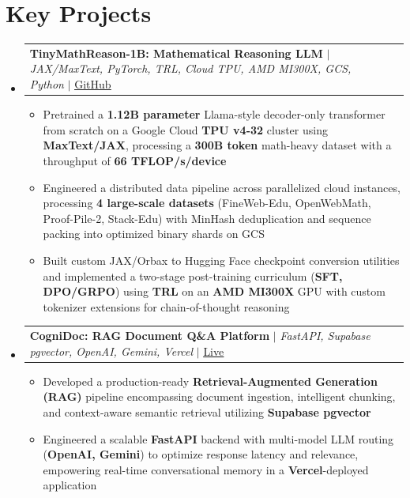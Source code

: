 \documentclass[letterpaper,11pt]{article}
\makeatletter
\newcommand{\resumeItem}[1]{
    \item\small{
        {#1 \vspace{-2pt}}
    }
    }
\newcommand{\resumeProjectHeading}[2]{
        \item
        \begin{tabular*}{0.97\textwidth}{l@{\extracolsep{\fill}}r}
        \small#1 & #2 \\
        \end{tabular*}\vspace{-7pt}
    }
\newcommand{\resumeSubHeadingListStart}{\begin{itemize}[leftmargin=0.15in, label={}]}
\newcommand{\resumeSubHeadingListEnd}{\end{itemize}}
\newcommand{\resumeItemListStart}{\begin{itemize}}
\newcommand{\resumeItemListEnd}{\end{itemize}\vspace{-5pt}}
\makeatother
\begin{document}
    \section{Key Projects}
    \resumeSubHeadingListStart
        \resumeProjectHeading
            {\textbf{TinyMathReason-1B: Mathematical Reasoning LLM} $|$ \emph{JAX/MaxText, PyTorch, TRL, Cloud TPU, AMD MI300X, GCS, Python} $|$ \href{https://github.com/himanshu-nakrani/TinyMathReason-1B}{\underline{GitHub}}}{}
            \resumeItemListStart
            \resumeItem{Pretrained a \textbf{1.12B parameter} Llama-style decoder-only transformer from scratch on a Google Cloud \textbf{TPU v4-32} cluster using \textbf{MaxText/JAX}, processing a \textbf{300B token} math-heavy dataset with a throughput of \textbf{66 TFLOP/s/device}}
            \resumeItem{Engineered a distributed data pipeline across parallelized cloud instances, processing \textbf{4 large-scale datasets} (FineWeb-Edu, OpenWebMath, Proof-Pile-2, Stack-Edu) with MinHash deduplication and sequence packing into optimized binary shards on GCS}
            \resumeItem{Built custom JAX/Orbax to Hugging Face checkpoint conversion utilities and implemented a two-stage post-training curriculum (\textbf{SFT, DPO/GRPO}) using \textbf{TRL} on an \textbf{AMD MI300X} GPU with custom tokenizer extensions for chain-of-thought reasoning}
            \resumeItemListEnd
        \resumeProjectHeading
            {\textbf{CogniDoc: RAG Document Q\&A Platform} $|$ \emph{FastAPI, Supabase pgvector, OpenAI, Gemini, Vercel} $|$ \href{https://document-qa-two.vercel.app}{\underline{Live}}}{}
            \resumeItemListStart
            \resumeItem{Developed a production-ready \textbf{Retrieval-Augmented Generation (RAG)} pipeline encompassing document ingestion, intelligent chunking, and context-aware semantic retrieval utilizing \textbf{Supabase pgvector}}
            \resumeItem{Engineered a scalable \textbf{FastAPI} backend with multi-model LLM routing (\textbf{OpenAI, Gemini}) to optimize response latency and relevance, empowering real-time conversational memory in a \textbf{Vercel}-deployed application}
            \resumeItemListEnd
    \resumeSubHeadingListEnd

\end{document}
